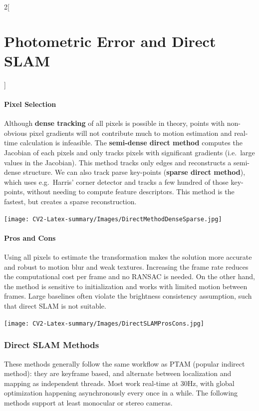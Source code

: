 \documentclass[oneside,fontsize=11pt,paper=a4]{scrartcl}
\begin{document}
\begin{multicols}{2}[\section{Photometric Error and Direct SLAM}]
\paragraph{Pixel Selection} Although \textbf{dense tracking} of all pixels is possible in theory, points with non-obvious pixel gradients will not contribute much to motion estimation and real-time calculation is infeasible. The \textbf{semi-dense direct method} computes the Jacobian of each pixels and only tracks pixels with significant gradients (i.e.\ large values in the Jacobian). This method tracks only edges and reconstructs a semi-dense structure. We can also track parse key-points (\textbf{sparse direct method}), which uses e.g.\ Harris' corner detector and tracks a few hundred of those key-points, without needing to compute feature descriptors. This method is the fastest, but creates a sparse reconstruction.

\begin{center}
    \texttt{[image: CV2-Latex-summary/Images/DirectMethodDenseSparse.jpg]}
\end{center}

\paragraph{Pros and Cons} Using all pixels to estimate the transformation makes the solution more accurate and robust to motion blur and weak textures. Increasing the frame rate reduces the computational cost per frame and no RANSAC is needed. On the other hand, the method is sensitive to initialization and works with limited motion between frames. Large baselines often violate the brightness consistency assumption, such that direct SLAM is not suitable.

\begin{center}
    \texttt{[image: CV2-Latex-summary/Images/DirectSLAMProsCons.jpg]}
\end{center}

\subsubsection{Direct SLAM Methods}

These methods generally follow the same workflow as PTAM (popular indirect method): they are keyframe based, and alternate between localization and mapping as independent threads. Most work real-time at 30Hz, with global optimization happening asynchronously every once in a while. The following methods support at least monocular or stereo cameras.


\end{multicols}
\end{document}
